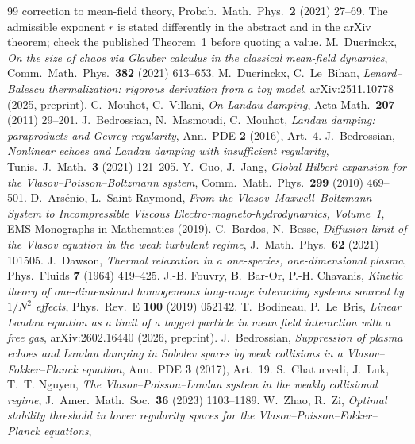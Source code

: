 \documentclass[11pt]{article}
\theoremstyle{definition}
\begin{document}
\begin{thebibliography}{99}
{correction to mean-field theory}, Probab.\ Math.\ Phys.\ \textbf{2} (2021)
27--69. The admissible exponent $r$ is stated differently in the abstract and
in the arXiv theorem; check the published Theorem~1 before quoting a value.
 M.~Duerinckx, \emph{On the size of chaos via Glauber
calculus in the classical mean-field dynamics}, Comm.\ Math.\ Phys.\
\textbf{382} (2021) 613--653.
 M.~Duerinckx, C.~Le~Bihan, \emph{Lenard--Balescu
thermalization: rigorous derivation from a toy model}, arXiv:2511.10778
(2025, preprint).
 C.~Mouhot, C.~Villani, \emph{On Landau damping}, Acta
Math.\ \textbf{207} (2011) 29--201.
 J.~Bedrossian, N.~Masmoudi, C.~Mouhot, \emph{Landau damping:
paraproducts and Gevrey regularity}, Ann.\ PDE \textbf{2} (2016), Art.~4.
\bibitem{BedrossianEcho} J.~Bedrossian, \emph{Nonlinear echoes and Landau
damping with insufficient regularity}, Tunis.\ J.\ Math.\ \textbf{3} (2021)
121--205.
 Y.~Guo, J.~Jang, \emph{Global Hilbert expansion for the
Vlasov--Poisson--Boltzmann system}, Comm.\ Math.\ Phys.\ \textbf{299} (2010)
469--501.
 D.~Ars\'enio, L.~Saint-Raymond, \emph{From the
Vlasov--Maxwell--Boltzmann System to Incompressible Viscous
Electro-magneto-hydrodynamics, Volume~1}, EMS Monographs in Mathematics
(2019).
 C.~Bardos, N.~Besse, \emph{Diffusion limit of the
Vlasov equation in the weak turbulent regime}, J.\ Math.\ Phys.\ \textbf{62}
(2021) 101505.
 J.~Dawson, \emph{Thermal relaxation in a one-species,
one-dimensional plasma}, Phys.\ Fluids \textbf{7} (1964) 419--425.
\bibitem{Fouvry} J.-B. Fouvry, B.~Bar-Or, P.-H. Chavanis, \emph{Kinetic theory
of one-dimensional homogeneous long-range interacting systems sourced by
$1/N^2$ effects}, Phys.\ Rev.\ E \textbf{100} (2019) 052142.
 T.~Bodineau, P.~Le~Bris, \emph{Linear Landau
equation as a limit of a tagged particle in mean field interaction with a
free gas}, arXiv:2602.16440 (2026, preprint).
 J.~Bedrossian, \emph{Suppression of plasma echoes and
Landau damping in Sobolev spaces by weak collisions in a
Vlasov--Fokker--Planck equation}, Ann.\ PDE \textbf{3} (2017), Art.~19.
\bibitem{CLN} S.~Chaturvedi, J.~Luk, T.~T. Nguyen, \emph{The
Vlasov--Poisson--Landau system in the weakly collisional regime}, J.\ Amer.\
Math.\ Soc.\ \textbf{36} (2023) 1103--1189.
\bibitem{ZhaoZi} W.~Zhao, R.~Zi, \emph{Optimal stability threshold in lower
regularity spaces for the Vlasov--Poisson--Fokker--Planck equations},

\end{thebibliography}
\end{document}
